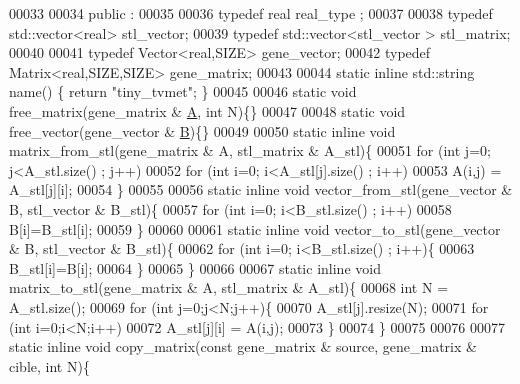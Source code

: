 \begin{DoxyCode}
00033 
00034 public :
00035 
00036   \textcolor{keyword}{typedef} real real\_type ;
00037 
00038   \textcolor{keyword}{typedef} std::vector<real>  stl\_vector;
00039   \textcolor{keyword}{typedef} std::vector<stl\_vector > stl\_matrix;
00040 
00041   \textcolor{keyword}{typedef} Vector<real,SIZE> gene\_vector;
00042   \textcolor{keyword}{typedef} Matrix<real,SIZE,SIZE> gene\_matrix;
00043 
00044   \textcolor{keyword}{static} \textcolor{keyword}{inline} std::string name() \{ \textcolor{keywordflow}{return} \textcolor{stringliteral}{"tiny\_tvmet"}; \}
00045 
00046   \textcolor{keyword}{static} \textcolor{keywordtype}{void} free\_matrix(gene\_matrix & \hyperlink{group___core___module_class_eigen_1_1_matrix}{A}, \textcolor{keywordtype}{int} N)\{\}
00047 
00048   \textcolor{keyword}{static} \textcolor{keywordtype}{void} free\_vector(gene\_vector & \hyperlink{group___core___module_class_eigen_1_1_matrix}{B})\{\}
00049 
00050   \textcolor{keyword}{static} \textcolor{keyword}{inline} \textcolor{keywordtype}{void} matrix\_from\_stl(gene\_matrix & A, stl\_matrix & A\_stl)\{
00051     \textcolor{keywordflow}{for} (\textcolor{keywordtype}{int} j=0; j<A\_stl.size() ; j++)
00052       \textcolor{keywordflow}{for} (\textcolor{keywordtype}{int} i=0; i<A\_stl[j].size() ; i++)
00053         A(i,j) = A\_stl[j][i];
00054   \}
00055 
00056   \textcolor{keyword}{static} \textcolor{keyword}{inline} \textcolor{keywordtype}{void} vector\_from\_stl(gene\_vector & B, stl\_vector & B\_stl)\{
00057     \textcolor{keywordflow}{for} (\textcolor{keywordtype}{int} i=0; i<B\_stl.size() ; i++)
00058       B[i]=B\_stl[i];
00059   \}
00060 
00061   \textcolor{keyword}{static} \textcolor{keyword}{inline} \textcolor{keywordtype}{void} vector\_to\_stl(gene\_vector & B, stl\_vector & B\_stl)\{
00062     \textcolor{keywordflow}{for} (\textcolor{keywordtype}{int} i=0; i<B\_stl.size() ; i++)\{
00063       B\_stl[i]=B[i];
00064     \}
00065   \}
00066 
00067   \textcolor{keyword}{static} \textcolor{keyword}{inline} \textcolor{keywordtype}{void} matrix\_to\_stl(gene\_matrix & A, stl\_matrix & A\_stl)\{
00068     \textcolor{keywordtype}{int} N = A\_stl.size();
00069     \textcolor{keywordflow}{for} (\textcolor{keywordtype}{int} j=0;j<N;j++)\{
00070       A\_stl[j].resize(N);
00071       \textcolor{keywordflow}{for} (\textcolor{keywordtype}{int} i=0;i<N;i++)
00072         A\_stl[j][i] = A(i,j);
00073     \}
00074   \}
00075 
00076 
00077   \textcolor{keyword}{static} \textcolor{keyword}{inline} \textcolor{keywordtype}{void} copy\_matrix(\textcolor{keyword}{const} gene\_matrix & source, gene\_matrix & cible, \textcolor{keywordtype}{int} N)\{

\end{DoxyCode}
